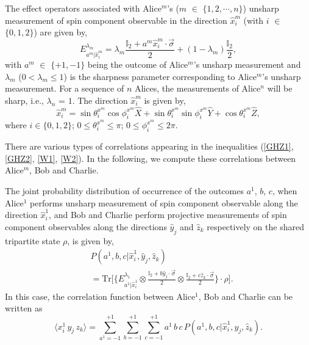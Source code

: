 \documentclass[pra,a4paper,aps,twocolumn,showpacs,superscriptaddress,groupedaddress]{revtex4}
\begin{document}
The effect operators associated with Alice$^m$'s ($m$ $\in$ $\{1, 2, \cdots, n \}$) unsharp measurement of spin component observable in the direction $\hat{x}^m_i$ (with $i$ $\in$ $\{0,1,2\}$) are given by,
\begin{equation}
E^{\lambda_m}_{a^m|\hat{x}^m_i} = \lambda_{m}\frac{\mathbb{I}_2+a^{m} \hat{x}^m_i \cdot \vec{\sigma}}{2}+(1-\lambda_{m})\frac{\mathbb{I}_2}{2},
\end{equation}
with $a^m$ $\in$ $\{+1, -1\}$ being the outcome of Alice$^m$'s unsharp measurement and $\lambda_m$ ($0 < \lambda_m \leq 1$) is the sharpness parameter corresponding to Alice$^m$'s unsharp measurement. For a sequence of $n$ Alices, the measurements of Alice$^n$ will be sharp, i.e., $\lambda_n$ = $1$. The direction $\hat{x}^m_i$ is given by,
\begin{equation}
\label{charliemdir}
\hat{x}^m_i = \sin \theta^{x^m}_i \cos \phi^{x^m}_i \hat{X} + \sin \theta^{x^m}_i \sin \phi^{x^m}_i \hat{Y} + \cos \theta^{x^m}_i \hat{Z},
\end{equation}
where $i \in \{0, 1, 2\}$; $0 \leq \theta^{x^m}_i  \leq \pi$; $0 \leq \phi^{x^m}_i  \leq 2 \pi$.

There are various types of correlations appearing in the inequalities (\ref{GHZ1}, \ref{GHZ2}, \ref{W1}, \ref{W2}). In the following, we compute these correlations between Alice$^m$, Bob and Charlie. 

The joint probability distribution of occurrence of the outcomes $a^1$, $b$, $c$, when Alice$^1$ performs unsharp measurement of spin component observable along the direction $\hat{x}^1_i$, and Bob and Charlie perform projective measurements of spin component observables along the directions $\hat{y}_j$ and $\hat{z}_k$ respectively on the shared tripartite state $\rho$, is given by,
\begin{align}
&P(a^1, b, c|\hat{x}^1_i, \hat{y}_j, \hat{z}_k) \nonumber \\
&=\text{Tr}\Bigg[\Bigg\{ E^{\lambda_1}_{a^1|\hat{x}^1_i} \otimes \frac{\mathbb{I}_2 + b \hat{y}_j \cdot \vec{\sigma}}{2} \otimes \frac{\mathbb{I}_2+ c \hat{z}_k \cdot \vec{\sigma}}{2}  \Bigg\}  \cdot \rho \Bigg].
\end{align}
In this case, the correlation function between Alice$^1$, Bob and Charlie can be written as 
\begin{equation}
\langle x^1_i \, y_j \, z_k \rangle =\sum_{a^1 = -1}^{ +1} \sum_{b =  -1}^{ +1} \sum_{c = -1}^{ +1} a^1 \, b \, c \, P(a^1, b, c|\hat{x}^1_i, \hat{y}_j, \hat{z}_k).
\end{equation} 
\end{document}
